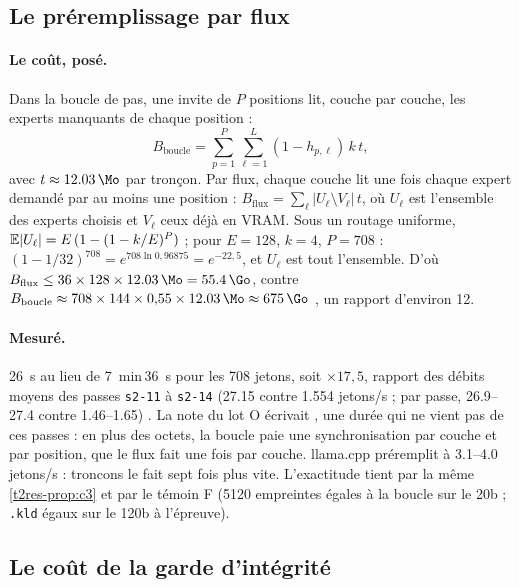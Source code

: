 \subsection{Le préremplissage par flux}\label{t2res-sec:flux}

\paragraph{Le coût, posé.} Dans la boucle de pas, une invite de $P$ positions lit, couche par couche, les experts manquants de chaque position :
\[
B_{\text{boucle}} = \sum_{p=1}^{P}\sum_{\ell=1}^{L} (1 - h_{p,\ell}) \, k \, t,
\]
avec $t \approx \SI{12.03}{\Mo}$ par tronçon. Par flux, chaque couche lit une fois chaque expert demandé par au moins une position : $B_{\text{flux}} = \sum_\ell |U_\ell \setminus V_\ell| \, t$, où $U_\ell$ est l'ensemble des experts choisis et $V_\ell$ ceux déjà en VRAM. Sous un routage uniforme, $\mathbb{E}|U_\ell| = E\,(1 - (1 - k/E)^P)$ ; pour $E = 128$, $k = 4$, $P = 708$ : $(1 - 1/32)^{708} = e^{708 \ln 0{,}96875} = e^{-22{,}5}$, et $U_\ell$ est tout l'ensemble. D'où $B_{\text{flux}} \le 36 \times 128 \times \SI{12.03}{\Mo} = \SI{55.4}{\Go}$, contre $B_{\text{boucle}} \approx 708 \times 144 \times 0{,}55 \times \SI{12.03}{\Mo} \approx \SI{675}{\Go}$ \calc, un rapport d'environ 12.

\paragraph{Mesuré.} \SI{26}{\second} au lieu de \SI{7}{\minute}\,\SI{36}{\second} pour les 708 jetons, soit $\times 17{,}5$, rapport des débits moyens des passes \texttt{s2-11} à \texttt{s2-14} (\num{27.15} contre \num{1.554} jetons/s ; par passe, \numrange{26.9}{27.4} contre \numrange{1.46}{1.65}) \mes. La note du lot O écrivait , une durée qui ne vient pas de ces passes : en plus des octets, la boucle paie une synchronisation par couche et par position, que le flux fait une fois par couche. llama.cpp préremplit à \numrange{3.1}{4.0} jetons/s : troncons le fait sept fois plus vite. L'exactitude tient par la même \cref{t2res-prop:c3} et par le témoin F (\num{5120} empreintes égales à la boucle sur le 20b ; \texttt{.kld} égaux sur le 120b à l'épreuve).

\subsection{Le coût de la garde d'intégrité}\label{t2res-sec:garde}


